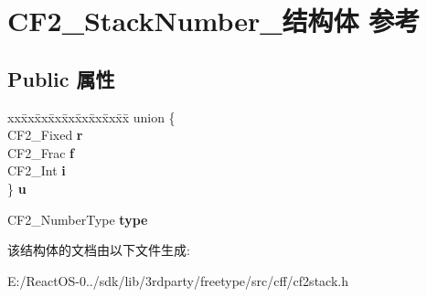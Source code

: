 \hypertarget{struct_c_f2___stack_number__}{}\section{C\+F2\+\_\+\+Stack\+Number\+\_\+结构体 参考}
\label{struct_c_f2___stack_number__}
\subsection*{Public 属性}
\begin{DoxyCompactItemize}
\item 
\mbox{\label{struct_c_f2___stack_number___aecca50047016e36227f585e631f8f262}} 
\begin{tabbing}
xx\=xx\=xx\=xx\=xx\=xx\=xx\=xx\=xx\=\kill
union \{\\
\>CF2\_Fixed {\bfseries r}\\
\>CF2\_Frac {\bfseries f}\\
\>CF2\_Int {\bfseries i}\\
\} {\bfseries u}\\

\end{tabbing}\item 
\mbox{\label{struct_c_f2___stack_number___a198405189f040b8cfbf3c9a64d0dc5e7}} 
C\+F2\+\_\+\+Number\+Type {\bfseries type}
\end{DoxyCompactItemize}


该结构体的文档由以下文件生成\+:\begin{DoxyCompactItemize}
\item 
E\+:/\+React\+O\+S-\/0../sdk/lib/3rdparty/freetype/src/cff/cf2stack.\+h\end{DoxyCompactItemize}
